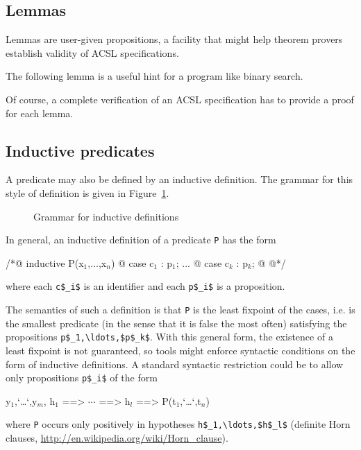 \subsection{Lemmas}
Lemmas are user-given propositions, a facility that might help theorem
provers establish validity of ACSL specifications.

\begin{example}
  The following lemma
  is a useful hint for a program like binary search.
\end{example}

Of course, a complete verification of an ACSL specification has to
provide a proof for each lemma.

\subsection{Inductive predicates}
\label{sec:inductivepredicates}

A predicate may also be defined by an inductive definition. The
grammar for this style of definition is given in
Figure~\ref{fig:gram:inductive}.
\begin{figure}[t]
  \begin{cadre}
      
    \end{cadre}
  \caption{Grammar for inductive definitions}
\label{fig:gram:inductive}
\end{figure}

In general, an inductive definition of a predicate \lstinline|P| has the form
\begin{listing}{1}
/*@ inductive P(x$_1$,$\ldots$,x$_n$) {
  @   case c$_1$ : p$_1$;
...
  @   case c$_k$ : p$_k$;
  @ }
  @*/
\end{listing}
where each \lstinline|c$_i$| is an identifier and each \lstinline|p$_i$| 
is a proposition.

The semantics of such a definition is that \lstinline|P| is the least fixpoint
of the cases, i.e. is the smallest predicate (in the sense that it is
false the most often) satisfying the propositions \lstinline|p$_1,\ldots,$p$_k$|.
With this general form, the existence of a least fixpoint is not
guaranteed, so tools might enforce syntactic conditions on the form of
inductive definitions. A standard syntactic restriction could be to
allow only propositions \lstinline|p$_i$| of the form
\begin{listing-nonumber}
\forall y$_1$,`\dots`,y$_m$, h$_1$ ==> $\cdots$ ==> h$_l$ ==> P(t$_1$,`\dots`,t$_n$)
\end{listing-nonumber}
where \lstinline|P| occurs only positively in hypotheses \lstinline|h$_1,\ldots,$h$_l$|
(definite Horn clauses,
\url{http://en.wikipedia.org/wiki/Horn_clause}).

